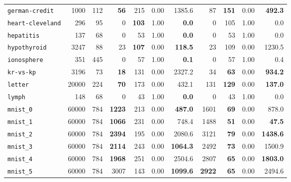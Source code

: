 \begin{tabular}{lccrrrrrrrr}
\texttt{german-credit} & \multicolumn{1}{r}{1000} & \multicolumn{1}{r}{112}  & \textbf{56} & 215 & 0.00 & 1385.6 & 87 & \textbf{151} & 0.00 & \textbf{492.3}\\
\texttt{heart-cleveland} & \multicolumn{1}{r}{296} & \multicolumn{1}{r}{95}  & 0 & \textbf{103} & 1.00 & \textbf{0.0} & 0 & 105 & 1.00 & 0.0\\
\texttt{hepatitis} & \multicolumn{1}{r}{137} & \multicolumn{1}{r}{68}  & 0 & 53 & 1.00 & \textbf{0.0} & 0 & 53 & 1.00 & 0.0\\
\texttt{hypothyroid} & \multicolumn{1}{r}{3247} & \multicolumn{1}{r}{88}  & 23 & \textbf{107} & 0.00 & \textbf{118.5} & 23 & 109 & 0.00 & 1230.5\\
\texttt{ionosphere} & \multicolumn{1}{r}{351} & \multicolumn{1}{r}{445}  & 0 & 57 & 1.00 & \textbf{0.1} & 0 & 57 & 1.00 & 0.4\\
\texttt{kr-vs-kp} & \multicolumn{1}{r}{3196} & \multicolumn{1}{r}{73}  & \textbf{18} & 131 & 0.00 & 2327.2 & 34 & \textbf{63} & 0.00 & \textbf{934.2}\\
\texttt{letter} & \multicolumn{1}{r}{20000} & \multicolumn{1}{r}{224}  & \textbf{70} & 173 & 0.00 & 432.1 & 131 & \textbf{129} & 0.00 & \textbf{137.0}\\
\texttt{lymph} & \multicolumn{1}{r}{148} & \multicolumn{1}{r}{68}  & 0 & 43 & 1.00 & \textbf{0.0} & 0 & 43 & 1.00 & 0.0\\
\texttt{mnist\_0} & \multicolumn{1}{r}{60000} & \multicolumn{1}{r}{784}  & \textbf{1223} & 213 & 0.00 & \textbf{487.0} & 1601 & \textbf{69} & 0.00 & 878.0\\
\texttt{mnist\_1} & \multicolumn{1}{r}{60000} & \multicolumn{1}{r}{784}  & \textbf{1066} & 231 & 0.00 & 748.4 & 1488 & \textbf{51} & 0.00 & \textbf{47.5}\\
\texttt{mnist\_2} & \multicolumn{1}{r}{60000} & \multicolumn{1}{r}{784}  & \textbf{2394} & 195 & 0.00 & 2080.6 & 3121 & \textbf{79} & 0.00 & \textbf{1438.6}\\
\texttt{mnist\_3} & \multicolumn{1}{r}{60000} & \multicolumn{1}{r}{784}  & \textbf{2114} & 243 & 0.00 & \textbf{1064.3} & 2492 & \textbf{73} & 0.00 & 1500.9\\
\texttt{mnist\_4} & \multicolumn{1}{r}{60000} & \multicolumn{1}{r}{784}  & \textbf{1968} & 251 & 0.00 & 2504.6 & 2807 & \textbf{65} & 0.00 & \textbf{1803.0}\\
\texttt{mnist\_5} & \multicolumn{1}{r}{60000} & \multicolumn{1}{r}{784}  & 3007 & 143 & 0.00 & \textbf{1099.6} & \textbf{2922} & \textbf{65} & 0.00 & 2494.6\\

\end{tabular}
